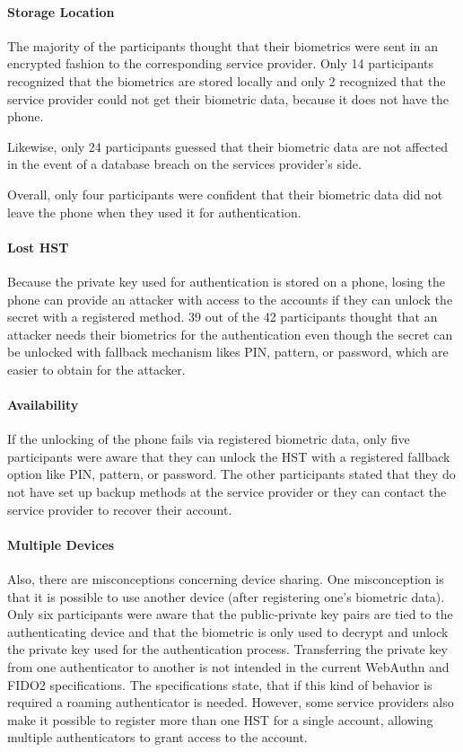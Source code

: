 \documentclass[runningheads]{llncs}
\begin{document}
\paragraph{Storage Location}
The majority of the participants thought that their biometrics were sent in an encrypted fashion to the corresponding service provider. Only 14 participants recognized that the biometrics are stored locally and only 2 recognized that the service provider could not get their biometric data, because it does not have the phone.

Likewise, only 24 participants guessed that their biometric data are not affected in the event of a database breach on the services provider's side.

Overall, only four participants were confident that their biometric data did not leave the phone when they used it for authentication.

\paragraph{Lost HST}
Because the private key used for authentication is stored on a phone, losing the phone can provide an attacker with access to the accounts if they can unlock the secret with a registered method. 39 out of the 42 participants thought that an attacker needs their biometrics for the authentication even though the secret can be unlocked with fallback mechanism likes PIN, pattern, or password, which are easier to obtain for the attacker.

\paragraph{Availability}
If the unlocking of the phone fails via registered biometric data, only five participants were aware that they can unlock the HST with a registered fallback option like PIN, pattern, or password. The other participants stated that they do not have set up backup methods at the service provider or they can contact the service provider to recover their account.

\paragraph{Multiple Devices}
Also, there are misconceptions concerning device sharing. One misconception is that it is possible to use another device (after registering one's biometric data). Only six participants were aware that the public-private key pairs are tied to the authenticating device and that the biometric is only used to decrypt and unlock the private key used for the authentication process. Transferring the private key from one authenticator to another is not intended in the current WebAuthn and FIDO2 specifications. The specifications state, that if this kind of behavior is required a roaming authenticator is needed. However, some service providers also make it possible to register more than one HST for a single account, allowing multiple authenticators to grant access to the account.
\end{document}
